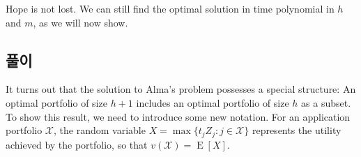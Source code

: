 \documentclass[12pt]{article} %
\newif\ifEN
\newtheorem{lemma}{Lemma}
\theoremstyle{definition}
\newtheorem{lemma}{기본정리}
\theoremstyle{definition}
\begin{document}
Hope is not lost. We can still find the optimal solution in time polynomial in $h$ and $m$, as we will now show.

\ifEN \subsection{The nestedness property}  \else \subsection{풀이} \fi
It turns out that the solution to Alma's problem possesses a special structure: An optimal portfolio of size $h+1$ includes an optimal portfolio of size $h$ as a subset. To show this result, we need to introduce some new notation. For an application portfolio $\mathcal{X}$, the random variable $X  = \max\{ t_j Z_j : j \in \mathcal{X}\}$ represents the utility achieved by the portfolio, so that $v(\mathcal{X}) = \operatorname{E}[X]$.
%
\end{document}
